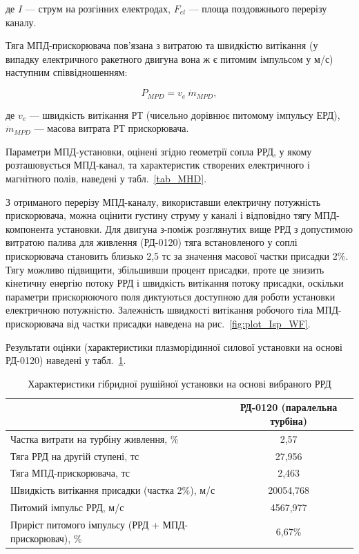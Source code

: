 де $I$ --- струм на розгінних електродах, $F_{el}$ --- площа поздовжнього перерізу каналу.

Тяга МПД-прискорювача пов'язана з витратою та швидкістю витікання (у випадку електричного ракетного двигуна вона ж є питомим імпульсом у м/с) наступним співвідношенням:

\begin{equation*}
	P_{MPD} = v_{e}~\dot{m}_{MPD},
\end{equation*}

де $v_{e}$ --- швидкість витікання РТ (чисельно дорівнює питомому імпульсу ЕРД), $\dot{m}_{MPD}$ --- масова витрата РТ прискорювача.

Параметри МПД-установки, оцінені згідно геометрії сопла РРД, у якому розташовується МПД-канал, та характеристик створених електричного і магнітного полів, наведені у табл.~\ref{tab_MHD}.

З отриманого перерізу МПД-каналу, використавши електричну потужність прискорювача, можна оцінити густину струму у каналі і відповідно тягу МПД-компонента установки. Для двигуна з-поміж розглянутих вище РРД з допустимою витратою палива для живлення (РД-0120) тяга встановленого у соплі прискорювача становить близько 2,5 тс за значення масової частки присадки 2\%. Тягу можливо підвищити, збільшивши процент присадки, проте це знизить кінетичну енергію потоку РРД і швидкість витікання потоку присадки, оскільки параметри прискорюючого поля диктуються доступною для роботи установки електричною потужністю. Залежність швидкості витікання робочого тіла МПД-прискорювача від частки присадки наведена на рис.~\ref{fig:plot_Isp_WF}.

Результати оцінки (характеристики плазморідинної силової установки на основі РД-0120) наведені у табл.~\ref{tab_PFRE}.

\begin{table}[t!]\centering\small
	\caption{Характеристики гібридної рушійної установки на основі вибраного РРД}
	\begin{tabular}{|l|c|}
		\hline
		& РД-0120 (паралельна турбіна) \\
		\hline
		Частка витрати на турбіну живлення, \% & 2,57 \\
		\hline
		Тяга РРД на другій ступені, тс         &  27,956 \\
		\hline
		Тяга МПД-прискорювача, тс              &  2,463 \\
		\hline
		Швидкість витікання присадки (частка 2\%), м/с   & 20054,768 \\
		\hline
		Питомий імпульс РРД, м/с   							& 4567,977  \\
		\hline
		Приріст питомого імпульсу (РРД + МПД-прискорювач), \%   &   6,67\% \\
		\hline
	\end{tabular}
	\label{tab_PFRE}
\end{table}



